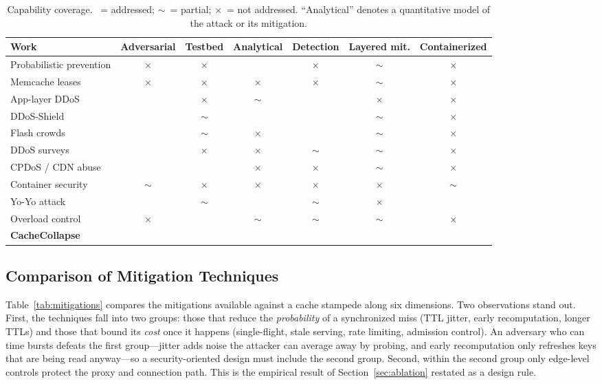 \documentclass[preprint,12pt]{elsarticle}
\newcommand{\yes}{\checkmark}
\newcommand{\no}{$\times$}
\newcommand{\prt}{$\sim$}
\begin{document}
\begin{table}[t]
\centering
\caption{Capability coverage. \yes~= addressed; \prt~= partial; \no~= not addressed.
``Analytical'' denotes a quantitative model of the attack or its mitigation.}
\label{tab:capability}
\small
\begin{tabular}{@{}lcccccc@{}}
\toprule
Work & Adversarial & Testbed & Analytical & Detection & Layered mit. & Containerized \\
\midrule
Probabilistic prevention \cite{vattani2015} & \no & \no & \yes & \no & \prt & \no \\
Memcache leases \cite{nishtala2013} & \no & \no & \no & \no & \prt & \no \\
App-layer DDoS \cite{xie2009,praseed2019} & \yes & \no & \prt & \yes & \no & \no \\
DDoS-Shield \cite{ranjan2009} & \yes & \prt & \yes & \yes & \prt & \no \\
Flash crowds \cite{jung2002,kandula2005} & \yes & \prt & \no & \yes & \prt & \no \\
DDoS surveys \cite{mirkovic2004,zargar2013} & \yes & \no & \no & \prt & \prt & \no \\
CPDoS / CDN abuse \cite{nguyen2019,guo2020} & \yes & \yes & \no & \no & \prt & \no \\
Container security \cite{combe2016,sultan2019} & \prt & \no & \no & \no & \no & \prt \\
Yo-Yo attack \cite{sides2016,bremlerbarr2017} & \yes & \prt & \yes & \prt & \no & \yes \\
Overload control \cite{welsh2001,welsh2003} & \no & \yes & \prt & \prt & \prt & \no \\
\textbf{CacheCollapse} & \yes & \yes & \yes & \yes & \yes & \yes \\
\bottomrule
\end{tabular}
\end{table}

\subsection{Comparison of Mitigation Techniques}
Table~\ref{tab:mitigations} compares the mitigations available against a cache stampede
along six dimensions. Two observations stand out. First, the techniques fall into two
groups: those that reduce the \emph{probability} of a synchronized miss (TTL jitter,
early recomputation, longer TTLs) and those that bound its \emph{cost} once it happens
(single-flight, stale serving, rate limiting, admission control). An adversary who
can time bursts defeats the first group---jitter adds noise the attacker can average
away by probing, and early recomputation only refreshes keys that are being read
anyway---so a security-oriented design must include the second group. Second, within
the second group only edge-level controls protect the proxy and connection path. This
is the empirical result of Section~\ref{sec:ablation} restated as a design rule.
\end{document}
